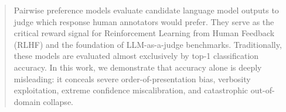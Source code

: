 \documentclass[12pt,a4paper]{article}
\begin{document}
\newpage
\tableofcontents
\newpage

\begin{abstract}
\noindent Pairwise preference models evaluate candidate language model outputs to judge which response human annotators would prefer. They serve as the critical reward signal for Reinforcement Learning from Human Feedback (RLHF) and the foundation of LLM-as-a-judge benchmarks. Traditionally, these models are evaluated almost exclusively by top-1 classification accuracy. In this work, we demonstrate that accuracy alone is deeply misleading: it conceals severe order-of-presentation bias, verbosity exploitation, extreme confidence miscalibration, and catastrophic out-of-domain collapse.


\end{abstract}
\end{document}
